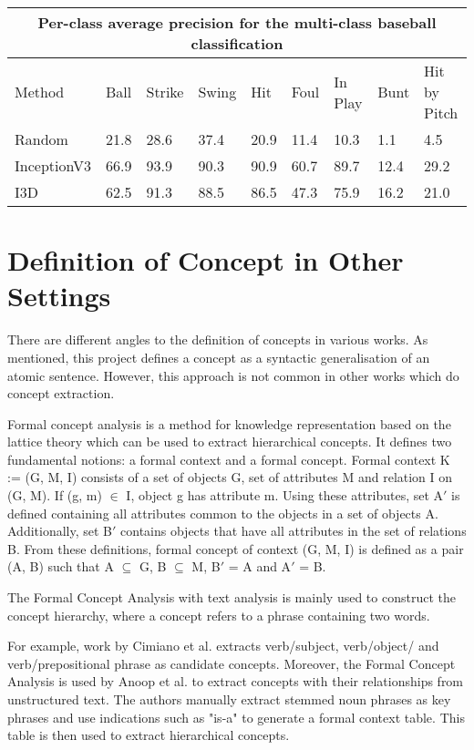 \begin{center}
\begin{tabular}{ |p{2cm}|p{1cm} p{1cm} p{1cm} p{1cm} p{1cm} p{1cm} p{1cm} p{1cm}|  }
 \hline
 \multicolumn{9}{|c|}{Per-class average precision for the multi-class baseball classification} \\
 \hline
 Method & Ball & Strike & Swing & Hit & Foul & In Play & Bunt & Hit by Pitch \\
 \hline
 Random & 21.8 & 28.6 & 37.4 & 20.9 & 11.4 & 10.3 & 1.1 & 4.5 \\
 InceptionV3 & 66.9 & 93.9 & 90.3 & 90.9 & 60.7 & 89.7 & 12.4 & 29.2 \\
 I3D & 62.5 & 91.3 & 88.5 & 86.5 & 47.3 & 75.9 & 16.2 & 21.0 \\
 \hline
 
\end{tabular}
\label{inclusion-exclusion-rules}
\end{center}


\section{Definition of Concept in Other Settings}

There are different angles to the definition of concepts in various works.
As mentioned, this project defines a concept as a syntactic generalisation of an atomic sentence.
However, this approach is not common in other works which do concept extraction.


Formal concept analysis \cite{RefWorks:RefID:31-ganter2012formal} is a method for knowledge representation based on the lattice theory which can be used to extract hierarchical concepts.
It defines two fundamental notions: a formal context and a formal concept. 
Formal context K := (G, M, I) consists of a set of objects G, set of attributes M and relation I on (G, M).
If (g, m) $\in$ I, object g has attribute m.
Using these attributes, set A$' $ is defined containing all attributes common to the objects in a set of objects A.
Additionally, set B$' $ contains objects that have all attributes in the set of relations B.
From these definitions, formal concept of context (G, M, I) is defined as a pair (A, B) such that A $\subseteq$ G, B $\subseteq$ M, B$' $ = A and A$' $ = B.

The Formal Concept Analysis with text analysis is mainly used to construct the concept hierarchy, where a concept refers to a phrase containing two words.

For example, work by Cimiano et al. \cite{RefWorks:RefID:32-cimiano2005learning} extracts verb/subject, verb/object/ and verb/prepositional phrase as candidate concepts.
Moreover, the Formal Concept Analysis is used by Anoop et al. \cite{RefWorks:RefID:33-anoop2019extracting} to extract concepts with their relationships from unstructured text.
The authors manually extract stemmed noun phrases as key phrases and use indications such as "is-a" to generate a formal context table.
This table is then used to extract hierarchical concepts.

